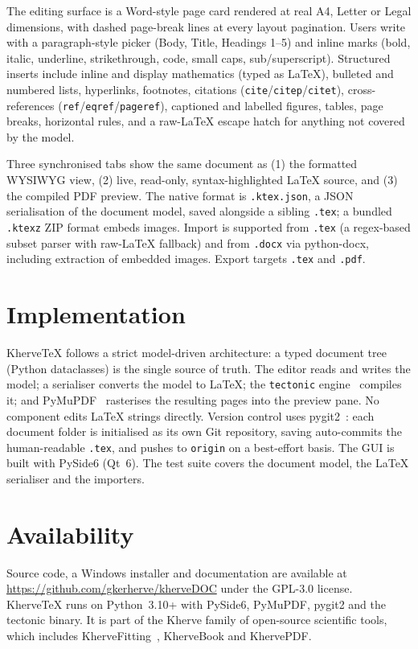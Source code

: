 \documentclass[11pt,a4paper]{article}
\begin{document}
The editing surface is a Word-style page card rendered at real A4, Letter or Legal dimensions, with dashed page-break lines at every layout pagination. Users write with a paragraph-style picker (Body, Title, Headings 1--5) and inline marks (bold, italic, underline, strikethrough, code, small caps, sub/superscript). Structured inserts include inline and display mathematics (typed as LaTeX), bulleted and numbered lists, hyperlinks, footnotes, citations (\texttt{cite}/\texttt{citep}/\texttt{citet}), cross-references (\texttt{ref}/\texttt{eqref}/\texttt{pageref}), captioned and labelled figures, tables, page breaks, horizontal rules, and a raw-LaTeX escape hatch for anything not covered by the model.

Three synchronised tabs show the same document as (1) the formatted WYSIWYG view, (2) live, read-only, syntax-highlighted LaTeX source, and (3) the compiled PDF preview. The native format is \texttt{.ktex.json}, a JSON serialisation of the document model, saved alongside a sibling \texttt{.tex}; a bundled \texttt{.ktexz} ZIP format embeds images. Import is supported from \texttt{.tex} (a regex-based subset parser with raw-LaTeX fallback) and from \texttt{.docx} via python-docx, including extraction of embedded images. Export targets \texttt{.tex} and \texttt{.pdf}.

\section{Implementation}

KherveTeX follows a strict model-driven architecture: a typed document tree (Python dataclasses) is the single source of truth. The editor reads and writes the model; a serialiser converts the model to LaTeX; the \texttt{tectonic} engine~\cite{tectonic} compiles it; and PyMuPDF~\cite{pymupdf} rasterises the resulting pages into the preview pane. No component edits LaTeX strings directly. Version control uses pygit2~\cite{pygit2}: each document folder is initialised as its own Git repository, saving auto-commits the human-readable \texttt{.tex}, and pushes to \texttt{origin} on a best-effort basis. The GUI is built with PySide6 (Qt~6). The test suite covers the document model, the LaTeX serialiser and the importers.

\section{Availability}

Source code, a Windows installer and documentation are available at \url{https://github.com/gkerherve/kherveDOC} under the GPL-3.0 license. KherveTeX runs on Python~3.10+ with PySide6, PyMuPDF, pygit2 and the tectonic binary. It is part of the Kherve family of open-source scientific tools, which includes KherveFitting~\cite{khervefitting}, KherveBook and KhervePDF.
\end{document}
